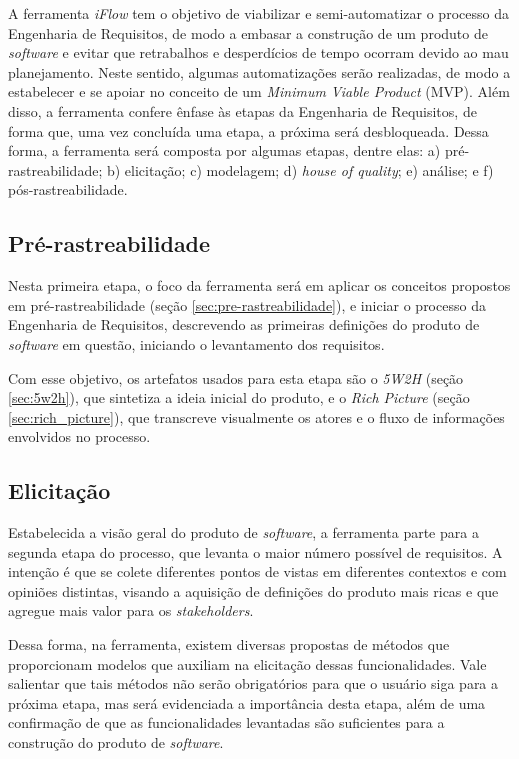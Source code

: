 \label{sec:sobre_a_ferramenta}

A ferramenta \textit{iFlow} tem o objetivo de viabilizar e semi-automatizar o processo da Engenharia de Requisitos, de modo a embasar a construção de um produto de \textit{software} e evitar que retrabalhos e desperdícios de tempo ocorram devido ao mau planejamento. Neste sentido, algumas automatizações serão realizadas, de modo a estabelecer e se apoiar no conceito de um \textit{Minimum Viable Product} (MVP). Além disso, a ferramenta confere ênfase às etapas da Engenharia de Requisitos, de forma que, uma vez concluída uma etapa, a próxima será desbloqueada. Dessa forma, a ferramenta será composta por algumas etapas, dentre elas: a) pré-rastreabilidade; b) elicitação; c) modelagem; d) \textit{house of quality}; e) análise; e f) pós-rastreabilidade. 

\subsection{Pré-rastreabilidade}

Nesta primeira etapa, o foco da ferramenta será em aplicar os conceitos propostos em pré-rastreabilidade (seção \ref{sec:pre-rastreabilidade}), e iniciar o processo da Engenharia de Requisitos, descrevendo as primeiras definições do produto de \textit{software} em questão, iniciando o levantamento dos requisitos.

Com esse objetivo, os artefatos usados para esta etapa são o \textit{5W2H} (seção \ref{sec:5w2h}), que sintetiza a ideia inicial do produto, e o \textit{Rich Picture} (seção \ref{sec:rich_picture}), que transcreve visualmente os atores e o fluxo de informações envolvidos no processo.

\subsection{Elicitação}

\label{sec:proc_elicitacao}

Estabelecida a visão geral do produto de \textit{software}, a ferramenta parte para a segunda etapa do processo, que levanta o maior número possível de requisitos. A intenção é que se colete diferentes pontos de vistas em diferentes contextos e com opiniões distintas, visando a aquisição de definições do produto mais ricas e que agregue mais valor para os \textit{stakeholders}.

Dessa forma, na ferramenta, existem diversas propostas de métodos que proporcionam modelos que auxiliam na elicitação dessas funcionalidades. Vale salientar que tais métodos não serão obrigatórios para que o usuário siga para a próxima etapa, mas será evidenciada a importância desta etapa, além de uma confirmação de que as funcionalidades levantadas são suficientes para a construção do produto de \textit{software}.

